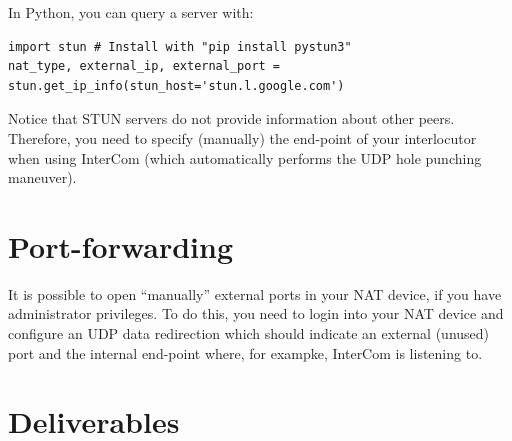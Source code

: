 In Python, you can query a server with:
\begin{verbatim}
import stun # Install with "pip install pystun3"
nat_type, external_ip, external_port = stun.get_ip_info(stun_host='stun.l.google.com')
\end{verbatim}

Notice that STUN servers do not provide information about other
peers. Therefore, you need to specify (manually) the end-point of your
interlocutor when using InterCom (which automatically performs the UDP
hole punching maneuver).

\section{Port-forwarding}

It is possible to open ``manually'' external ports in your NAT device,
if you have administrator privileges. To do this, you need to login
into your NAT device and configure an UDP data redirection which
should indicate an external (unused) port and the internal end-point
where, for exampke, InterCom is listening to.

\section{Deliverables}

